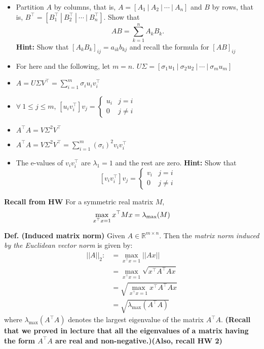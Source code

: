 \documentclass[letterpaper]{article}
\newcommand{\real}{\mathbb R}  %
\begin{document}
\begin{itemize}

\item Partition $A$ by columns, that is, $A=\left[ A_1~|~A_2~|~\cdots~|~A_n\right]$ and $B$ by rows, that is, $B^\top=\left[ B_1^\top~|~B_2^\top~|~\cdots~|~B_n^\top\right]$. Show that
$$AB = \sum_{k=1}^n A_k B_k. $$
 \textbf{Hint:} Show that $\left[ A_kB_k \right]_{ij}= a_{ik} b_{kj}$ and recall the formula for  $\left[ AB \right]_{ij}$

\item For here and the following, let $m=n$. $U \Sigma =\left[\sigma_1 u_1~|~ \sigma_2 u_2 ~|~\cdots ~|~ \sigma_m u_m \right]$

\item $A=U \Sigma V^\top = \sum_{i=1}^{m} \sigma_i u_i v_i^\top $

\item $\forall~1 \le j \le m$, $\left[  u_i v_i^\top\right] v_j = \begin{cases} u_i & j=i \\ 0 & j \neq i\end{cases}  $

\item $A^\top A =V \Sigma^2 V^\top$

\item $A^\top A=V \Sigma^2 V^\top = \sum_{i=1}^{m} (\sigma_i)^2 v_i v_i^\top $

\item The e-values of $v_i v_i^\top$ are $\lambda_1=1$ and the rest are zero. \textbf{Hint:} Show that
$$\left[  v_i v_i^\top\right] v_j = \begin{cases} v_i & j=i \\ 0 & j \neq i\end{cases}  $$

\end{itemize}





\newpage

\noindent \textbf{Recall from HW} For a symmetric real matrix $M$, $$\max_{x^\top x = 1} x^\top M x = \lambda_{\rm max}(M)$$



\noindent \textbf{Def. (Induced matrix norm)} Given $A\in \real^{m\times n}$. Then the \textit{matrix norm induced by the Euclidean vector norm} is given by:
\begin{align}||A||_2:&=\max_{x^\top x = 1} ||Ax|| \\
& = \max_{x^\top x = 1}  \sqrt{x^\top A^\top Ax} \\
& = \sqrt{\max_{x^\top x = 1} x^\top A^\top Ax} \\
&=\sqrt{\lambda_{\text{max}}(A^\top A)}\end{align}
where $\lambda_{\text{max}}(A^\top A)$ denotes the largest eigenvalue of the matrix $A^\top A$. \textbf{(Recall that we proved in lecture that all the eigenvalues of a matrix having the form $A^\top A$ are real and non-negative.)(Also, recall HW 2)} \\
\end{document}

